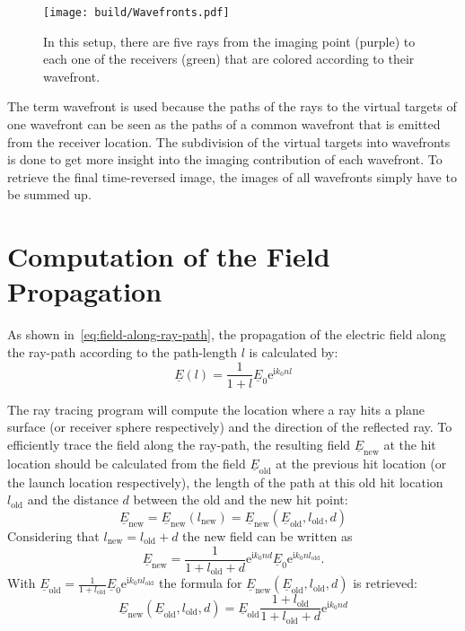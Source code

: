 \begin{figure}
    \centering
    \texttt{[image: build/Wavefronts.pdf]}
    \caption{In this setup, there are five rays from the imaging point (purple) to each one of the receivers (green) that are colored according to their wavefront.}\label{fig:Wavefronts}
\end{figure}

The term wavefront is used because the paths of the rays to the virtual targets of one wavefront can be seen as the paths of a common wavefront that is emitted from the receiver location.
The subdivision of the virtual targets into wavefronts is done to get more insight into the imaging contribution of each wavefront.
To retrieve the final time-reversed image, the images of all wavefronts simply have to be summed up.

\newpage
\section{Computation of the Field Propagation}\label{section:calculation_of_the_field_propagation}
As shown in~\eqref{eq:field-along-ray-path}, the propagation of the electric field along the ray-path according to the path-length \(l\) is calculated by:
\begin{equation}
    \underline{E}(l) = \frac{1}{1 + l} \underline{E}_0 \mathrm{e}^{\mathrm{i} k_0 n l}
\end{equation} 

The ray tracing program will compute the location where a ray hits a plane surface (or receiver sphere respectively) and the direction of the reflected ray.
To efficiently trace the field along the ray-path, the resulting field \(\underline{E}_{\text{new}}\) at the hit location should be calculated from the field \(\underline{E}_{\text{old}}\) at the previous hit location (or the launch location respectively), the length of the path at this old hit location \(l_{\text{old}}\) and the distance \(d\) between the old and the new hit point:
\begin{equation}
    \underline{E}_{\text{new}} = \underline{E}_{\text{new}}(l_{\text{new}}) = \underline{E}_{\text{new}}(\underline{E}_{\text{old}}, l_{\text{old}}, d)
\end{equation}
Considering that \(l_{\text{new}} = l_{\text{old}} + d\) the new field can be written as
\begin{equation}
    \underline{E}_{\text{new}} = \frac{1}{1 + l_{\text{old}} + d} \mathrm{e}^{\mathrm{i} k_0 n d}  \underline{E}_{0} \mathrm{e}^{\mathrm{i} k_0 n l_{\text{old}}}.
\end{equation}
With \(\underline{E}_{\text{old}} = \frac{1}{1 + l_{\text{old}}} \underline{E}_0 \mathrm{e}^{\mathrm{i} k_0 n l_{\text{old}}} \) the formula for \(\underline{E}_{\text{new}}(\underline{E}_{\text{old}}, l_{\text{old}}, d)\) is retrieved:
\begin{equation}
    \underline{E}_{\text{new}}(\underline{E}_{\text{old}}, l_{\text{old}}, d) = \underline{E}_{\text{old}} \frac{1 + l_{\text{old}}}{1 + l_{\text{old}} + d} \mathrm{e}^{\mathrm{i} k_0 n d}
\end{equation}

